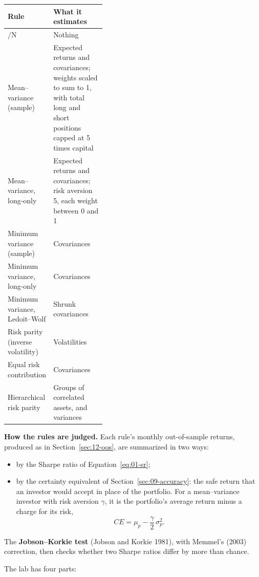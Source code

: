 \begin{center}
\small
\begin{tabularx}{0.9\linewidth}{@{}>{\raggedright\arraybackslash}p{0.38\linewidth}>{\raggedright\arraybackslash}X@{}}
\toprule
Rule & What it estimates \\
\midrule
1/N & Nothing \\
Mean--variance (sample) & Expected returns and covariances; weights scaled to sum to 1, with total long and short positions capped at 5 times capital \\
Mean--variance, long-only & Expected returns and covariances; risk aversion 5, each weight between 0 and 1 \\
Minimum variance (sample) & Covariances \\
Minimum variance, long-only & Covariances \\
Minimum variance, Ledoit--Wolf & Shrunk covariances \\
Risk parity (inverse volatility) & Volatilities \\
Equal risk contribution & Covariances \\
Hierarchical risk parity & Groups of correlated assets, and variances \\
\bottomrule
\end{tabularx}
\end{center}

\textbf{How the rules are judged.} Each rule's monthly out-of-sample returns, produced as in Section~\ref{sec:12-oos}, are summarized in two ways:
\begin{itemize}
  \item by the Sharpe ratio of Equation~\eqref{eq:01-sr};
  \item by the certainty equivalent of Section~\ref{sec:09-accuracy}: the safe return that an investor would accept in place of the portfolio. For a mean--variance investor with risk aversion $\gamma$, it is the portfolio's average return minus a charge for its risk,
  \begin{equation}
    CE = \mu_p - \frac{\gamma}{2}\,\sigma_p^2.
    \label{eq:12-ce}
  \end{equation}
\end{itemize}
The \textbf{Jobson--Korkie test} (Jobson and Korkie 1981), with Memmel's (2003) correction, then checks whether two Sharpe ratios differ by more than chance.

The lab has four parts:

